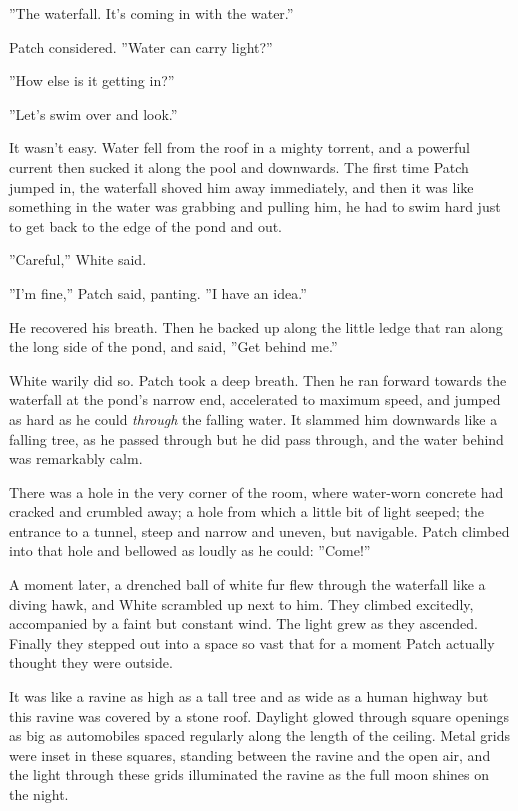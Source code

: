 \documentclass[12pt]{book}
\begin{document}
''The waterfall. It's coming in with the water.''

Patch considered. ''Water can carry light?''

''How else is it getting in?''

''Let's swim over and look.''

It wasn't easy. Water fell from the roof in a mighty torrent, and a powerful current then sucked it along the pool and downwards. The first time Patch jumped in, the waterfall shoved him away immediately, and then it was like something in the water was grabbing and pulling him, he had to swim hard just to get back to the edge of the pond and out.

''Careful,'' White said.

''I'm fine,'' Patch said, panting. ''I have an idea.''

He recovered his breath. Then he backed up along the little ledge that ran along the long side of the pond, and said, ''Get behind me.''

White warily did so. Patch took a deep breath. Then he ran forward towards the waterfall at the pond's narrow end, accelerated to maximum speed, and jumped as hard as he could {\it through }the falling water. It slammed him downwards like a falling tree, as he passed through %
but he did pass through, and the water behind was remarkably calm.

There was a hole in the very corner of the room, where water-worn concrete had cracked and crumbled away; a hole from which a little bit of light seeped; the entrance to a tunnel, steep and narrow and uneven, but navigable. Patch climbed into that hole and bellowed as loudly as he could: ''Come!''

A moment later, a drenched ball of white fur flew through the waterfall like a diving hawk, and White scrambled up next to him. They climbed excitedly, accompanied by a faint but constant wind. The light grew as they ascended. Finally they stepped out into a space so vast that for a moment Patch actually thought they were outside.

It was like a ravine as high as a tall tree and as wide as a human highway %
but this ravine was covered by a stone roof. Daylight glowed through square openings as big as automobiles spaced regularly along the length of the ceiling. Metal grids were inset in these squares, standing between the ravine and the open air, and the light through these grids illuminated the ravine as the full moon shines on the night.
\end{document}

